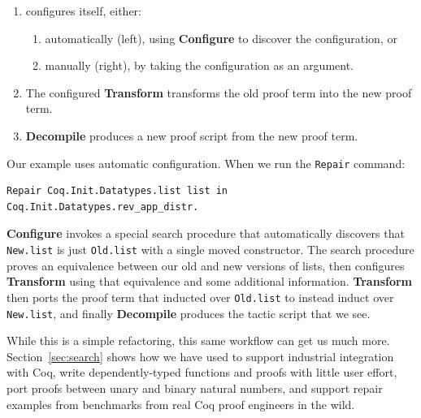 \begin{enumerate}
\item \toolname configures itself, either:
\begin{enumerate}
\item automatically (left), using \textbf{Configure} to discover the configuration, or
\item manually (right), by taking the configuration as an argument.
\end{enumerate}
\item The configured \textbf{Transform} transforms the old proof term into the new proof term.
\item \textbf{Decompile} produces a new proof script from the new proof term.
\end{enumerate}

Our example uses automatic configuration. When we run the \lstinline{Repair} command:

\begin{lstlisting}
Repair Coq.Init.Datatypes.list list in Coq.Init.Datatypes.rev_app_distr.
\end{lstlisting}
\textbf{Configure} invokes a special search procedure that automatically discovers that \lstinline{New.list}
is just \lstinline{Old.list} with a single moved constructor.
The search procedure proves an equivalence between our old and new versions of lists,
then configures \textbf{Transform} using that equivalence and some additional information.
\textbf{Transform} then ports the proof term that inducted over \lstinline{Old.list}
to instead induct over \lstinline{New.list}, and finally
\textbf{Decompile} produces the tactic script that we see.

While this is a simple refactoring, this same workflow can get us much more.
Section~\ref{sec:search} shows how we have used \toolname to support industrial integration with Coq,
write dependently-typed functions and proofs with little user effort,
port proofs between unary and binary natural numbers,
and support repair examples from benchmarks from real Coq proof engineers in the wild.

